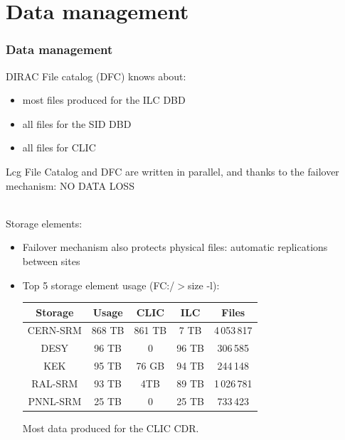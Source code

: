 \documentclass[10pt,table,dvipsnames]{beamer}
\begin{document}
\section{Data management}
\begin{frame}
\frametitle{Data management}
DIRAC File catalog (DFC) knows about:
\begin{itemize}
\item most files produced for the ILC DBD
\item all files for the SID DBD
\item all files for CLIC
\end{itemize}
Lcg File Catalog and DFC are written in parallel, and
thanks to the failover mechanism: \alert{NO DATA LOSS}

~\\

Storage elements:
\begin{itemize}
\item Failover mechanism also protects physical files: automatic replications between sites
\item Top 5 storage element usage {\scriptsize (FC:/$>$size -l)}:\\
\begin{center}
\begin{tabular}{|ccccc|}
\hline
Storage & Usage & CLIC & ILC & Files \\
\hline
CERN-SRM & 868 TB & 861 TB & 7 TB & 4\,053\,817\\
\hline
DESY & 96 TB & 0 & 96 TB& 306\,585\\
\hline
KEK & 95 TB & 76 GB & 94 TB & 244\,148\\
\hline
RAL-SRM & 93 TB & 4TB & 89 TB & 1\,026\,781\\
\hline
PNNL-SRM & 25 TB & 0 & 25 TB & 733\,423\\
\hline
\end{tabular}
\end{center}
Most data produced for the CLIC CDR.
\end{itemize}

\end{frame}
\end{document}
